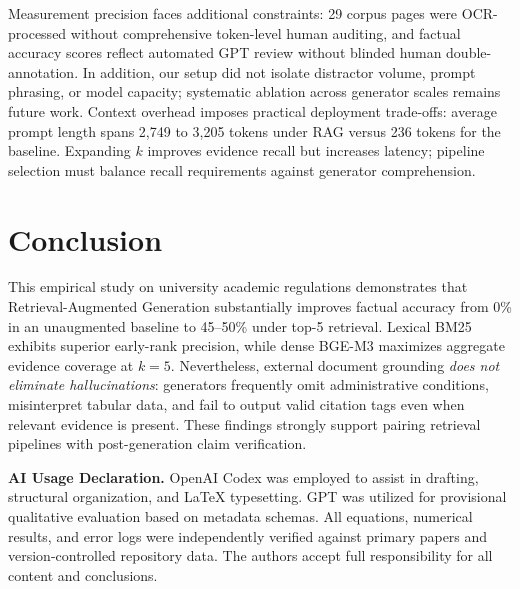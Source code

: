 \documentclass[12pt,a4paper]{article}
\begin{document}
Measurement precision faces additional constraints: 29 corpus pages were OCR-processed without comprehensive token-level human auditing, and factual accuracy scores reflect automated GPT review without blinded human double-annotation. In addition, our setup did not isolate distractor volume, prompt phrasing, or model capacity; systematic ablation across generator scales remains future work. Context overhead imposes practical deployment trade-offs: average prompt length spans 2,749 to 3,205 tokens under RAG versus 236 tokens for the baseline. Expanding $k$ improves evidence recall but increases latency; pipeline selection must balance recall requirements against generator comprehension.

\section{Conclusion}

This empirical study on university academic regulations demonstrates that Retrieval-Augmented Generation substantially improves factual accuracy from 0\% in an unaugmented baseline to 45--50\% under top-5 retrieval. Lexical BM25 exhibits superior early-rank precision, while dense BGE-M3 maximizes aggregate evidence coverage at $k=5$. Nevertheless, external document grounding \emph{does not eliminate hallucinations}: generators frequently omit administrative conditions, misinterpret tabular data, and fail to output valid citation tags even when relevant evidence is present. These findings strongly support pairing retrieval pipelines with post-generation claim verification.

\textbf{AI Usage Declaration.} OpenAI Codex was employed to assist in drafting, structural organization, and LaTeX typesetting. GPT was utilized for provisional qualitative evaluation based on metadata schemas. All equations, numerical results, and error logs were independently verified against primary papers and version-controlled repository data. The authors accept full responsibility for all content and conclusions.
\end{document}
